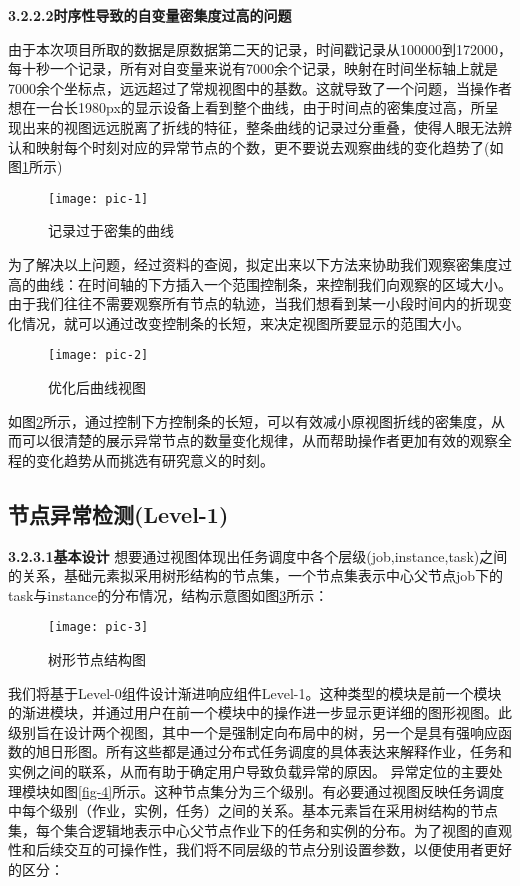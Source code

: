 {\textbf{3.2.2.2\quad 时序性导致的自变量密集度过高的问题}}

由于本次项目所取的数据是原数据第二天的记录，时间戳记录从100000到172000，每十秒一个记录，所有对自变量来说有7000余个记录，映射在时间坐标轴上就是7000余个坐标点，远远超过了常规视图中的基数。这就导致了一个问题，当操作者想在一台长1980px的显示设备上看到整个曲线，由于时间点的密集度过高，所呈现出来的视图远远脱离了折线的特征，整条曲线的记录过分重叠，使得人眼无法辨认和映射每个时刻对应的异常节点的个数，更不要说去观察曲线的变化趋势了(如图\ref{pic-1}所示)

\begin{figure}[h]
	\centering
	\texttt{[image: pic-1]}
	\caption{记录过于密集的曲线}
	\label{pic-1}
\end{figure}

为了解决以上问题，经过资料的查阅，拟定出来以下方法来协助我们观察密集度过高的曲线：在时间轴的下方插入一个范围控制条，来控制我们向观察的区域大小。由于我们往往不需要观察所有节点的轨迹，当我们想看到某一小段时间内的折现变化情况，就可以通过改变控制条的长短，来决定视图所要显示的范围大小。

\begin{figure}[h]
	\centering
	\texttt{[image: pic-2]}
	\caption{优化后曲线视图}
	\label{pic-2}
\end{figure}

如图\ref{pic-2}所示，通过控制下方控制条的长短，可以有效减小原视图折线的密集度，从而可以很清楚的展示异常节点的数量变化规律，从而帮助操作者更加有效的观察全程的变化趋势从而挑选有研究意义的时刻。

\subsection{节点异常检测(Level-1)}

{\textbf{3.2.3.1\quad 基本设计}}
想要通过视图体现出任务调度中各个层级(job,instance,task)之间的关系，基础元素拟采用树形结构的节点集，一个节点集表示中心父节点job下的task与instance的分布情况，结构示意图如图\ref{pic-3}所示：

\begin{figure}[h]
	\centering
	\texttt{[image: pic-3]}
	\caption{树形节点结构图}
	\label{pic-3}
\end{figure}

我们将基于Level-0组件设计渐进响应组件Level-1。这种类型的模块是前一个模块的渐进模块，并通过用户在前一个模块中的操作进一步显示更详细的图形视图。此级别旨在设计两个视图，其中一个是强制定向布局中的树，另一个是具有强响应函数的旭日形图。所有这些都是通过分布式任务调度的具体表达来解释作业，任务和实例之间的联系，从而有助于确定用户导致负载异常的原因。
异常定位的主要处理模块如图\ref{fig-4}所示。这种节点集分为三个级别。有必要通过视图反映任务调度中每个级别（作业，实例，任务）之间的关系。基本元素旨在采用树结构的节点集，每个集合逻辑地表示中心父节点作业下的任务和实例的分布。为了视图的直观性和后续交互的可操作性，我们将不同层级的节点分别设置参数，以便使用者更好的区分：

